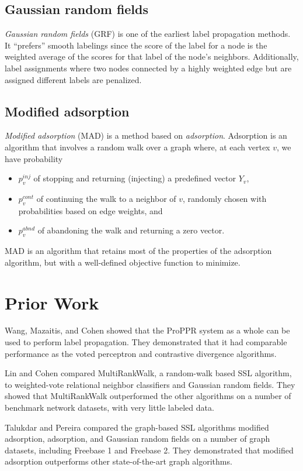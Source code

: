 \documentclass[12pt]{article}
\begin{document}
\subsection{Gaussian random fields}
\textit{Gaussian random fields} (GRF) \cite{zhu2003combining} is one of the earliest label propagation methods.
It ``prefers'' smooth labelings since the score of the label for a node is the weighted average of the scores for that label of the node's neighbors.
Additionally, label assignments where two nodes connected by a highly weighted edge but are assigned different labels are penalized.

\subsection{Modified adsorption}
\textit{Modified adsorption} (MAD) \cite{talukdar2009new,talukdar2010experiments} is a method based on {\it adsorption}. \cite{baluja2008video}
Adsorption is an algorithm that involves a random walk over a graph where, at each vertex $v$, we have probability
\begin{itemize}
\item $p_v^{inj}$ of stopping and returning (injecting) a predefined vector $Y_v$,
\item $p_v^{cont}$ of continuing the walk to a neighbor of $v$, randomly chosen with probabilities based on edge weights, and
\item $p_v^{abnd}$ of abandoning the walk and returning a zero vector.
\end{itemize}
MAD is an algorithm that retains most of the properties of the adsorption algorithm, but with a well-defined objective function to minimize.

\section{Prior Work}
Wang, Mazaitis, and Cohen \cite{wang2013programming} showed that the ProPPR system as a whole can be used to perform label propagation.
They demonstrated that it had comparable performance as the voted perceptron and contrastive divergence algorithms.

Lin and Cohen \cite{lin2010semi} compared MultiRankWalk, a random-walk based SSL algorithm, to weighted-vote relational neighbor classifiers and Gaussian random fields.
They showed that MultiRankWalk outperformed the other algorithms on a number of benchmark network datasets, with very little labeled data.

Talukdar and Pereira \cite{talukdar2010experiments} compared the graph-based SSL algorithms modified adsorption, adsorption, and Gaussian random fields on a number of graph datasets, including Freebase 1 and Freebase 2.
They demonstrated that modified adsorption outperforms other state-of-the-art graph algorithms.
\end{document}
